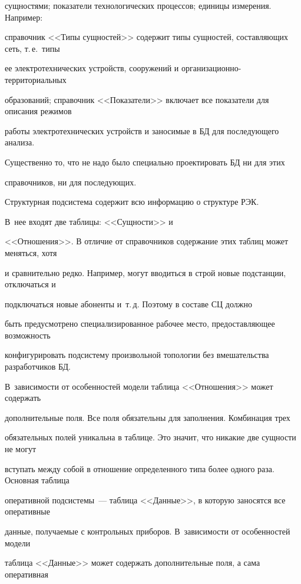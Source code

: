 сущностями; показатели технологических процессов; единицы измерения. Например: 


справочник <<Типы сущностей>> содержит типы сущностей, составляющих сеть, т.\,е.\ типы 


ее электротехнических устройств, сооружений и ор\-га\-ни\-за\-ци\-он\-но-тер\-ри\-то\-ри\-аль\-ных 


образований; справочник <<Показатели>> включает все показатели для описания режимов 


работы электротехнических устройств и заносимые в БД для последующего анализа. 


Существенно то, что не надо было специально проектировать БД ни для этих 


справочников, ни для последующих. 


  


  Структурная под\-сис\-те\-ма содержит всю информацию о структуре РЭК. 


  В~нее входят две таблицы: <<Сущности>> и 


<<Отношения>>. В отличие от справочников содержание этих таблиц может меняться, хотя 


и сравнительно редко. Например, могут вводиться в строй новые подстанции, отключаться и 


подключаться новые абоненты и~т.\,д. Поэтому в составе СЦ должно 


быть предусмотрено специализированное рабочее место, предоставляющее возможность 


конфигурировать под\-сис\-те\-му произвольной топологии без вмешательства разработчиков БД. 


В~зависимости от особенностей модели таблица <<Отношения>> может содержать 


дополнительные поля. Все поля обязательны для заполнения. Комбинация трех 


обязательных полей уникальна в таб\-ли\-це. Это значит, что никакие две сущности не могут 


вступать между собой в отношение определенного типа более одного раза. Основная таб\-ли\-ца 


оперативной под\-сис\-те\-мы~--- таблица <<Данные>>, в которую заносятся все оперативные 


данные, получаемые с контрольных приборов. В~зависимости от особенностей модели 


таб\-ли\-ца <<Данные>> может содержать дополнительные поля, а сама оперативная 



